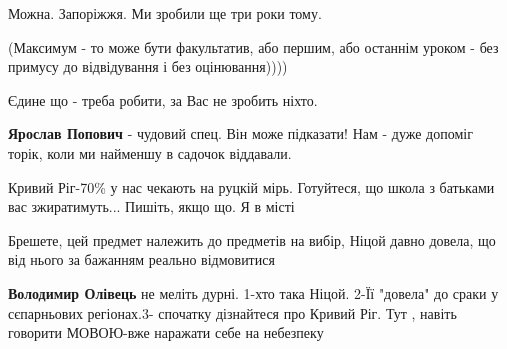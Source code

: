 \begin{itemize}
 

Можна. Запоріжжя. Ми зробили ще три роки тому.

(Максимум - то може бути факультатив, або першим, або останнім уроком - без
примусу до відвідування і без оцінювання))))

Єдине що - треба робити, за Вас не зробить ніхто.

 
\textbf{Ярослав Попович} - чудовий спец. Він може підказати! Нам - дуже допоміг торік, коли ми найменшу в садочок віддавали.

 
Кривий Ріг-70\% у нас чекають на руцкій мірь. Готуйтеся, що школа з батьками вас зжиратимуть... Пишіть, якщо що. Я в місті

 
Брешете, цей предмет належить до предметів на вибір, Ніцой давно довела, що від нього за бажанням реально відмовитися

\begin{itemize}
 
\textbf{Володимир Олівець} не меліть дурні. 1-хто така Ніцой. 2-Її "довела" до сраки у сєпарньових регіонах.3- спочатку дізнайтеся про Кривий Ріг. Тут , навіть говорити МОВОЮ-вже наражати себе на небезпеку


\end{itemize}
\end{itemize}
